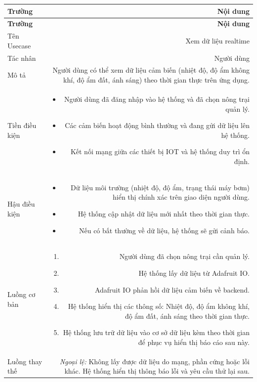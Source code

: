 \begin{longtable}{|L|R|}
 
\hline
\textbf{Trường} & \textbf{Nội dung} \\ \hline
 
\endfirsthead
 
\hline
\textbf{Trường} & \textbf{Nội dung} \\ \hline
 
\endhead
 
\endfoot
 
Tên Usecase & Xem dữ liệu realtime \\[4pt] \hline
 
Tác nhân & Người dùng \\[4pt] \hline
 
Mô tả & Người dùng có thể xem dữ liệu cảm biến (nhiệt độ, độ ẩm không khí, độ ẩm đất, ánh sáng) theo thời gian thực trên ứng dụng. \\[4pt] \hline
 
Tiền điều kiện &
\begin{itemize}[leftmargin=*, nosep, topsep=2pt]
  \item Người dùng đã đăng nhập vào hệ thống và đã chọn nông trại quản lý.
  \item Các cảm biến hoạt động bình thường và đang gửi dữ liệu lên hệ thống.
  \item Kết nối mạng giữa các thiết bị IOT và hệ thống duy trì ổn định.
\end{itemize} \\[4pt] \hline
 
Hậu điều kiện &
\begin{itemize}[leftmargin=*, nosep, topsep=2pt]
  \item Dữ liệu môi trường (nhiệt độ, độ ẩm, trạng thái máy bơm) hiển thị chính xác trên giao diện người dùng.
  \item Hệ thống cập nhật dữ liệu mới nhất theo thời gian thực.
  \item Nếu có bất thường về dữ liệu, hệ thống sẽ gửi cảnh báo.
\end{itemize} \\[4pt] \hline
 
Luồng cơ bản &
\begin{enumerate}[leftmargin=*, nosep, topsep=2pt]
  \item Người dùng đã chọn nông trại cần quản lý.
  \item Hệ thống lấy dữ liệu từ Adafruit IO.
  \item Adafruit IO phản hồi dữ liệu cảm biến về backend.
  \item Hệ thống hiển thị các thông số: Nhiệt độ, độ ẩm không khí, độ ẩm đất, ánh sáng theo thời gian thực.
  \item Hệ thống lưu trữ dữ liệu vào cơ sở dữ liệu kèm theo thời gian để phục vụ hiển thị báo cáo sau này.
\end{enumerate} \\[4pt] \hline
 
Luồng thay thế &
\textit{Ngoại lệ:} Không lấy được dữ liệu do mạng, phần cứng hoặc lỗi khác.
Hệ thống hiển thị thông báo lỗi và yêu cầu thử lại sau. \\[4pt] \hline
 
\end{longtable}
